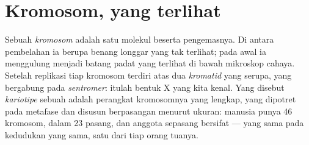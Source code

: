 \section{Kromosom, yang terlihat}

\begin{definition}\label{def:g11:cell-cycle-mitosis:chromosome}
Sebuah \emph{kromosom} adalah satu molekul  beserta 
pengemasnya. Di antara pembelahan ia berupa benang longgar yang tak
terlihat; pada awal  ia menggulung menjadi batang padat yang
terlihat di bawah mikroskop cahaya. Setelah replikasi tiap kromosom
terdiri atas dua \emph{kromatid} yang serupa, yang
bergabung pada \emph{sentromer}: itulah bentuk X yang
kita kenal. Yang disebut \emph{kariotipe} sebuah
 adalah perangkat kromosomnya yang lengkap, yang dipotret pada
metafase dan disusun berpasangan menurut ukuran:  manusia punya 46
kromosom, dalam 23 pasang, dan anggota sepasang bersifat
\emph{} ---  yang sama pada kedudukan yang sama, satu dari
tiap orang tuanya.
\end{definition}

